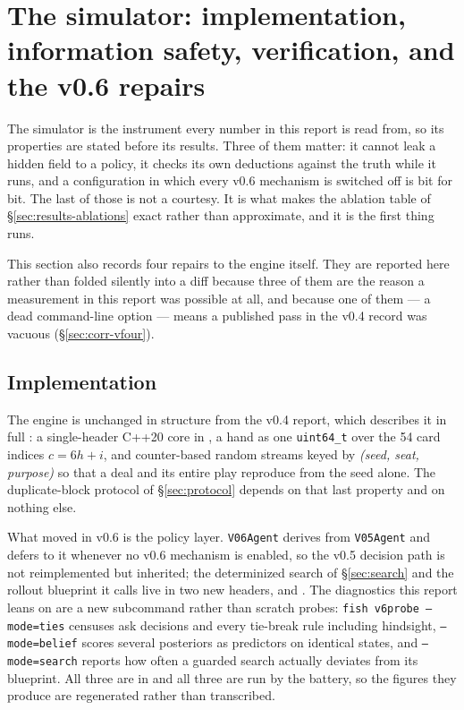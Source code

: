 \section{The simulator: implementation, information safety, verification, and the v0.6 repairs}
\label{sec:engine}

The simulator is the instrument every number in this report is read from, so its
properties are stated before its results. Three of them matter: it cannot leak a
hidden field to a policy, it checks its own deductions against the truth while it
runs, and a configuration in which every v0.6 mechanism is switched off is
\vfive{} bit for bit. The last of those is not a courtesy. It is what makes the
ablation table of \S\ref{sec:results-ablations} exact rather than approximate,
and it is the first thing  runs.

This section also records four repairs to the engine itself. They are reported
here rather than folded silently into a diff because three of them are the
reason a measurement in this report was possible at all, and because one of them
--- a dead command-line option --- means a published pass in the v0.4 record was
vacuous (\S\ref{sec:corr-vfour}).

\subsection{Implementation}
\label{sec:engine-impl}

The engine is unchanged in structure from the v0.4 report, which describes it in
full \cite{fishbot04}: a single-header C++20 core in , a
hand as one \verb|uint64_t| over the 54 card indices $c = 6h + i$, and
counter-based random streams keyed by \emph{(seed, seat, purpose)} so that a deal
and its entire play reproduce from the seed alone. The duplicate-block protocol
of \S\ref{sec:protocol} depends on that last property and on nothing else.

What moved in v0.6 is the policy layer. \texttt{V06Agent} derives from
\texttt{V05Agent} and defers to it whenever no v0.6 mechanism is enabled, so the
v0.5 decision path is not reimplemented but inherited; the determinized search of
\S\ref{sec:search} and the rollout blueprint it calls live in two new headers,
 and . The
diagnostics this report leans on are a new subcommand rather than scratch
probes: \texttt{fish v6probe --mode=ties} censuses ask decisions and every
tie-break rule including hindsight, \texttt{--mode=belief} scores several
posteriors as predictors on identical states, and \texttt{--mode=search} reports
how often a guarded search actually deviates from its blueprint. All three are in
 and all three are run by the battery, so the
figures they produce are regenerated rather than transcribed.

